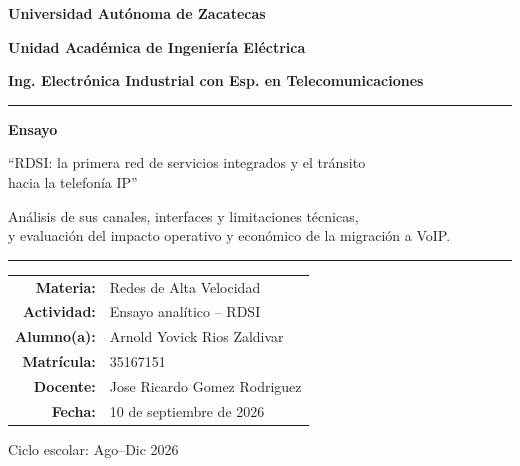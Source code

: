 \documentclass[12pt,a4paper]{article}
\begin{document}
\begin{titlepage}
    \centering
    \vspace*{1cm}
    {\Large\bfseries Universidad Autónoma de Zacatecas\par}
    \vspace{0.4cm}
    {\large\bfseries Unidad Académica de Ingeniería Eléctrica\par}
    {\large\bfseries Ing. Electrónica Industrial con Esp. en Telecomunicaciones\par}
    \vspace{1.5cm}
    \noindent\rule{\textwidth}{0.8pt}
    \vspace{1cm}
    {\huge\bfseries Ensayo\par}
    \vspace{0.7cm}
    {\Large ``RDSI: la primera red de servicios integrados y el tránsito \\ hacia la telefonía IP''\par}
    \vspace{0.6cm}
    {\normalsize Análisis de sus canales, interfaces y limitaciones técnicas, \\ y evaluación del impacto operativo y económico de la migración a VoIP.\par}
    \vspace{1cm}
    \noindent\rule{\textwidth}{0.8pt}
    \vspace{1.8cm}

    \begin{tabular}{r l}
        \textbf{Materia:}    & Redes de Alta Velocidad \\[0.35cm]
        \textbf{Actividad:}  & Ensayo analítico -- RDSI \\[0.35cm]
        \textbf{Alumno(a):}  & Arnold Yovick Rios Zaldivar \\[0.35cm]
        \textbf{Matrícula:}  & 35167151 \\[0.35cm]
        \textbf{Docente:}    & Jose Ricardo Gomez Rodriguez \\[0.35cm]
        \textbf{Fecha:}      & 10 de septiembre de 2026
    \end{tabular}

    \vfill
    Ciclo escolar: Ago--Dic 2026
    \vspace*{0.5cm}
\end{titlepage}
\setcounter{page}{1}

\end{document}
